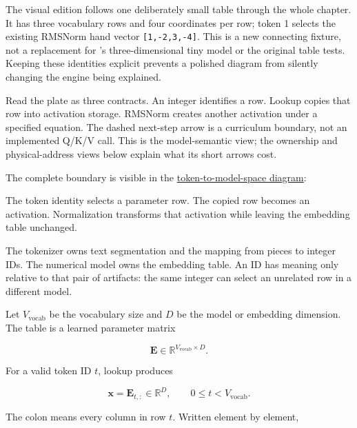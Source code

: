 
The visual edition follows one deliberately small table through the
whole chapter. It has three vocabulary rows and four coordinates per
row; token 1 selects the existing RMSNorm hand vector
\texttt{{[}1,-2,3,-4{]}}. This is a new connecting fixture, not a
replacement for 's three-dimensional tiny model or the original
 table tests. Keeping these identities explicit prevents a
polished diagram from silently changing the engine being explained.

Read the plate as three contracts. An integer identifies a row. Lookup
copies that row into activation storage. RMSNorm creates another
activation under a specified equation. The dashed next-step arrow is a
curriculum boundary, not an implemented Q/K/V call. This is the
model-semantic view; the ownership and physical-address views below
explain what its short arrows cost.

The complete boundary is visible in the
\href{https://github.com/hermonai/inside-the-llm-engine/blob/astra-visual-rewrite/diagrams/transformer/token-to-model-space.txt}{token-to-model-space
diagram}:

The token identity selects a parameter row. The copied row becomes an activation. Normalization transforms that activation while leaving the embedding table unchanged.

The tokenizer owns text segmentation and the mapping from pieces to
integer IDs. The numerical model owns the embedding table. An ID has
meaning only relative to that pair of artifacts: the same integer can
select an unrelated row in a different model.

Let \(V_{\mathrm{vocab}}\) be the vocabulary size and \(D\) be the model
or embedding dimension. The table is a learned parameter matrix

\begin{equation}
\mathbf{E}\in\mathbb{R}^{V_{\mathrm{vocab}}\times D}.
\end{equation}

For a valid token ID \(t\), lookup produces

\begin{equation}
\mathbf{x}=\mathbf{E}_{t,:}\in\mathbb{R}^{D},
\qquad 0\le t<V_{\mathrm{vocab}}.
\end{equation}

The colon means every column in row \(t\). Written element by element,

